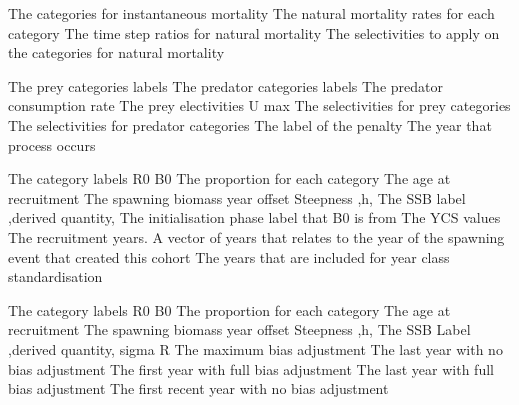  {The categories for instantaneous mortality}
 {The natural mortality rates for each category}
 {The time step ratios for natural mortality}
 {The selectivities to apply on the categories for natural mortality}
\par\textbf{}\par
{} {The prey categories labels}
 {The predator categories labels}
 {The predator consumption rate}
 {The prey electivities}
 {U max}
 {The selectivities for prey categories}
 {The selectivities for predator categories}
 {The label of the penalty}
 {The year that process occurs}
\par\textbf{}\par
{} {The category labels}
 {R0}
 {B0}
 {The proportion for each category}
 {The age at recruitment}
 {The spawning biomass year offset}
 {Steepness ,h,}
 {The SSB label ,derived quantity,}
 {The initialisation phase label that B0 is from}
 {The YCS values}
 {The recruitment years. A vector of years that relates to the year of the spawning event that created this cohort}
 {The years that are included for year class standardisation}
\par\textbf{}\par
{} {The category labels}
 {R0}
 {B0}
 {The proportion for each category}
 {The age at recruitment}
 {The spawning biomass year offset}
 {Steepness ,h,}
 {The SSB Label ,derived quantity,}
 {sigma R}
 {The maximum bias adjustment}
 {The last year with no bias adjustment}
 {The first year with full bias adjustment}
 {The last year with full bias adjustment}
 {The first recent year with no bias adjustment}
